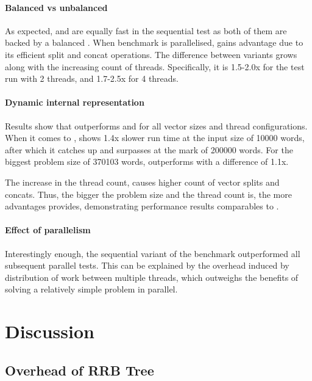 \paragraph{Balanced vs unbalanced}
As expected, \rbvec{} and \rrbvec{} are equally fast in the sequential test as both of them are backed by a balanced \rbtree{}. When benchmark is parallelised, \rrbvec{} gains advantage due to its efficient split and concat operations. The difference between variants grows along with the increasing count of threads. Specifically, it is 1.5-2.0x for the test run with 2 threads, and 1.7-2.5x for 4 threads.

\paragraph{Dynamic internal representation}
Results show that \pvec{} outperforms \rbvec{} and \rrbvec{} for all vector sizes and thread configurations. When it comes to \stdvec{}, \pvec{} shows 1.4x slower run time at the input size of 10000 words, after which it catches up and surpasses \stdvec{} at the mark of 200000 words. For the biggest problem size of 370103 words, \pvec{} outperforms \stdvec{} with a difference of 1.1x. 

The increase in the thread count, causes higher count of vector splits and concats. Thus, the bigger the problem size and the thread count is, the more advantages \pvec{} provides, demonstrating performance results comparables to \stdvec{}. 

\paragraph{Effect of parallelism}
Interestingly enough, the sequential variant of the benchmark outperformed all subsequent parallel tests. This can be explained by the overhead induced by distribution of work between multiple threads, which outweighs the benefits of solving a relatively simple problem in parallel.

\section{Discussion}


\subsection{Overhead of RRB Tree}

